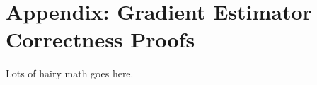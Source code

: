 \section*{Appendix: Gradient Estimator Correctness Proofs}
\label{sec:appendix_proofs}

Lots of hairy math goes here.